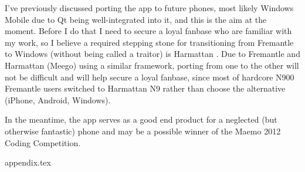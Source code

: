 \documentclass[11pt]{article} %
\begin{document}
I’ve previously discussed porting the app to future phones, most likely Windows Mobile due to Qt being well-integrated into it, and this is the aim at the moment. Before I do that I need to secure a loyal fanbase who are familiar with my work, so I believe a required stepping stone for transitioning from Fremantle to Windows (without being called a traitor) is Harmattan . Due to Fremantle and Harmattan (Meego) using a similar framework, porting from one to the other will not be difficult and will help secure a loyal fanbase, since most of hardcore N900 Fremantle users switched to Harmattan N9 rather than choose the alternative (iPhone, Android, Windows).

In the meantime, the app serves as a good end product for a neglected (but otherwise fantastic) phone and may be a possible winner of the Maemo 2012 Coding Competition.

\pagebreak
{appendix.tex}
\end{document}
